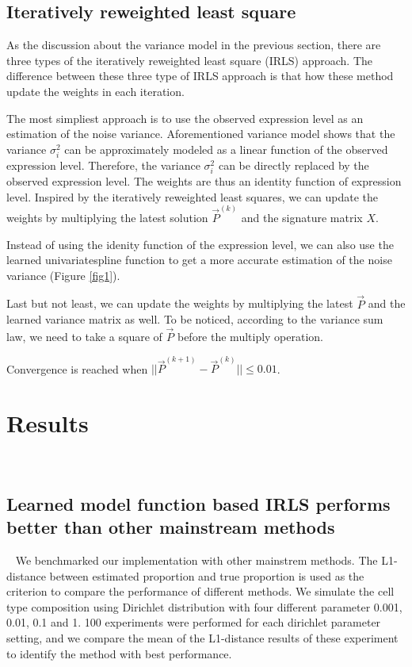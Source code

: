 \documentclass[10pt, a4paper, oneside]{article}
\begin{document}
\subsection{Iteratively reweighted least square}
\justify
As the discussion about the variance model in the previous section, there are three types of the iteratively
reweighted least square (IRLS) approach. The difference between these three type of IRLS approach is that how these
method update the weights in each iteration.

The most simpliest approach is to use the observed expression level as an estimation of the noise variance.
Aforementioned variance model shows that the variance $\sigma_i^2$ can be approximately modeled as a linear function of the observed expression level. 
Therefore, the variance $\sigma_i^2$ can be directly replaced by the observed expression level. The weights are thus an identity function of
expression level. Inspired by the iteratively reweighted least squares, we can update the weights by multiplying the latest solution $\vec{P}^{(k)}$ and the signature matrix $X$.

Instead of using the idenity function of the expression level, we can also use the learned univariatespline function to get a more accurate estimation
of the noise variance (Figure \ref{fig1}). 

Last but not least, we can update the weights by multiplying the latest $\vec{P}$ and the learned variance matrix as well.
To be noticed, according to the variance sum law, we need to take a square of $\vec{P}$ before the multiply operation.
 
Convergence is reached when $||\vec{P}^{(k+1)} - \vec{P}^{(k)}|| \leq 0.01$.

\section{Results}  %
\subsection{Learned model function based IRLS performs better than other mainstream methods}  %
\justify
We benchmarked our implementation with other mainstrem methods. The L1-distance between estimated proportion and true proportion 
is used as the criterion to compare the
performance of different methods. We simulate the cell type composition using Dirichlet distribution with
four different parameter 0.001, 0.01, 0.1 and 1.
100 experiments were performed for each dirichlet parameter setting, and we compare the mean of the L1-distance results of these experiment
to identify the method with best performance. 
\end{document}
